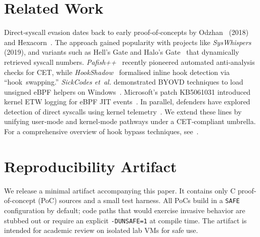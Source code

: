 \documentclass[11pt,letterpaper]{article}
\begin{document}
\section{Related Work}
\label{sec:related}
Direct‑syscall evasion dates back to early proof‑of‑concepts by Odzhan~\cite{Odzhan2018} (2018) and Hexacorn~\cite{Hexacorn2017}. The approach gained popularity with projects like \emph{SysWhispers}~\cite{SysWhispers2019} (2019), and variants such as Hell’s Gate and Halo’s Gate~\cite{Trickster2021} that dynamically retrieved syscall numbers. \emph{Pafish++}~\cite{Pafish2024} recently pioneered automated anti‑analysis checks for CET, while \emph{HookShadow}~\cite{HookShadow2023} formalised inline hook detection via “hook swapping.” \emph{SickCodes et al.} demonstrated BYOVD techniques to load unsigned eBPF helpers on Windows~\cite{SickCodes2024}. Microsoft’s patch KB5061031 introduced kernel ETW logging for eBPF JIT events~\cite{MSFT2025}. In parallel, defenders have explored detection of direct syscalls using kernel telemetry~\cite{Chechik2024}. We extend these lines by unifying user‑mode and kernel‑mode pathways under a CET‑compliant umbrella. For a comprehensive overview of hook bypass techniques, see \cite{MDSec2020}.

\section{Reproducibility Artifact}
\label{sec:repro}
We release a minimal artifact accompanying this paper. It contains only C proof-of-concept (PoC) sources and a small test harness. All PoCs build in a \texttt{SAFE} configuration by default; code paths that would exercise invasive behavior are stubbed out or require an explicit \texttt{-DUNSAFE=1} at compile time. The artifact is intended for academic review on isolated lab VMs for safe use.
\end{document}
